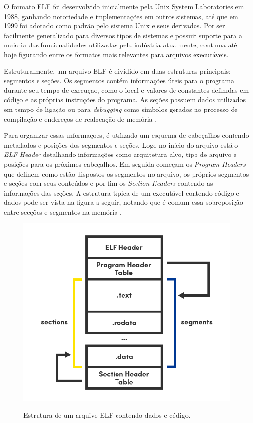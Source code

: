 O formato ELF foi desenvolvido inicialmente pela Unix System Laboratories em 1988, ganhando notoriedade e implementações em outros sistemas, até que em 1999 foi adotado como padrão pelo sistema Unix e seus derivados. Por ser facilmente generalizado para diversos tipos de sistemas e possuir suporte para a maioria das funcionalidades utilizadas pela indústria atualmente, continua até hoje figurando entre os formatos mais relevantes para arquivos executáveis.

Estruturalmente, um arquivo ELF é dividido em duas estruturas principais: segmentos e seções. Os segmentos contém informações úteis para o programa durante seu tempo de execução, como o local e valores de constantes definidas em código e as próprias instruções do programa. As seções possuem dados utilizados em tempo de ligação ou para \textit{debugging} como símbolos gerados no processo de compilação e endereços de realocação de memória \cite{elf}.

Para organizar essas informações, é utilizado um esquema de cabeçalhos contendo metadados e posições dos segmentos e seções. Logo no início do arquivo está o \textit{ELF Header} detalhando informações como arquitetura alvo, tipo de arquivo e posições para os próximos cabeçalhos. Em seguida começam os \textit{Program Headers} que definem como estão dispostos os segmentos no arquivo, os próprios segmentos e seções com seus conteúdos e por fim os \textit{Section Headers} contendo as informações das seções. A estrutura típica de um executável contendo código e dados pode ser vista na figura a seguir, notando que é comum essa sobreposição entre secções e segmentos na memória \cite{elf}.

\begin{figure}[!htb]
     \centering
     \caption{Estrutura de um arquivo ELF contendo dados e código.}
     \includegraphics[width=13cm]{images/TCC2.png}
     \label{}
\end{figure}

